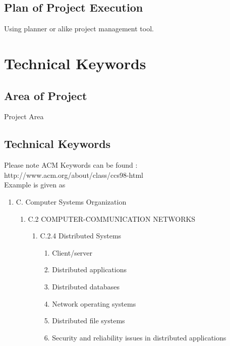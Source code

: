 \documentclass[oneside,a4paper,12pt]{report}
\begin{document}
\section{Plan of Project Execution}
  Using planner or alike project management tool.



\chapter{Technical Keywords}
\section{Area of Project}
Project Area

\section{Technical Keywords}
Please note ACM Keywords can be found : http://www.acm.org/about/class/ccs98-html \\
Example is given as

\begin{enumerate}
	\item C. Computer Systems Organization 
	\begin{enumerate}
		\item C.2 COMPUTER-COMMUNICATION NETWORKS 
		\begin{enumerate}
			\item C.2.4 Distributed Systems 
			\begin{enumerate}
				\item  Client/server 
\item Distributed applications
\item Distributed databases
\item Network operating systems 
\item Distributed file systems
\item Security and reliability issues in distributed applications
	 		\end{enumerate} 
		\end{enumerate} 
	  

	
	\end{enumerate}
\end{enumerate}
\end{document}
